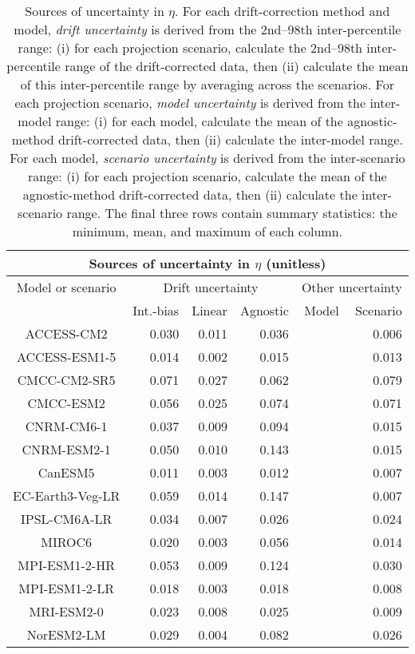 \begin{table*}[t]
\centering
\caption{Sources of uncertainty in $\eta$. For each drift-correction method and model, \emph{drift uncertainty} is derived from the 2nd--98th inter-percentile range: (i) for each projection scenario, calculate the 2nd--98th inter-percentile range of the drift-corrected data, then (ii) calculate the mean of this inter-percentile range by averaging across the scenarios. For each projection scenario, \emph{model uncertainty} is derived from the inter-model range: (i) for each model, calculate the mean of the agnostic-method drift-corrected data, then (ii) calculate the inter-model range. For each model, \emph{scenario uncertainty} is derived from the inter-scenario range: (i) for each projection scenario, calculate the mean of the agnostic-method drift-corrected data, then (ii) calculate the inter-scenario range. The final three rows contain summary statistics: the minimum, mean, and maximum of each column.}
\begin{tabular}{c|rrr|rr}
\toprule
\multicolumn{6}{c}{Sources of uncertainty in $\eta$ (unitless)} \\ 
\midrule
Model or scenario & \multicolumn{3}{c|}{Drift uncertainty} & \multicolumn{2}{c}{Other uncertainty} \\
 & Int.-bias & Linear & Agnostic & Model & Scenario \\
\midrule
ACCESS-CM2 & 0.030 & 0.011 & 0.036 &  & 0.006 \\
ACCESS-ESM1-5 & 0.014 & 0.002 & 0.015 &  & 0.013 \\
CMCC-CM2-SR5 & 0.071 & 0.027 & 0.062 &  & 0.079 \\
CMCC-ESM2 & 0.056 & 0.025 & 0.074 &  & 0.071 \\
CNRM-CM6-1 & 0.037 & 0.009 & 0.094 &  & 0.015 \\
CNRM-ESM2-1 & 0.050 & 0.010 & 0.143 &  & 0.015 \\
CanESM5 & 0.011 & 0.003 & 0.012 &  & 0.007 \\
EC-Earth3-Veg-LR & 0.059 & 0.014 & 0.147 &  & 0.007 \\
IPSL-CM6A-LR & 0.034 & 0.007 & 0.026 &  & 0.024 \\
MIROC6 & 0.020 & 0.003 & 0.056 &  & 0.014 \\
MPI-ESM1-2-HR & 0.053 & 0.009 & 0.124 &  & 0.030 \\
MPI-ESM1-2-LR & 0.018 & 0.003 & 0.018 &  & 0.008 \\
MRI-ESM2-0 & 0.023 & 0.008 & 0.025 &  & 0.009 \\
NorESM2-LM & 0.029 & 0.004 & 0.082 &  & 0.026 \\

\end{tabular}
\end{table*}
